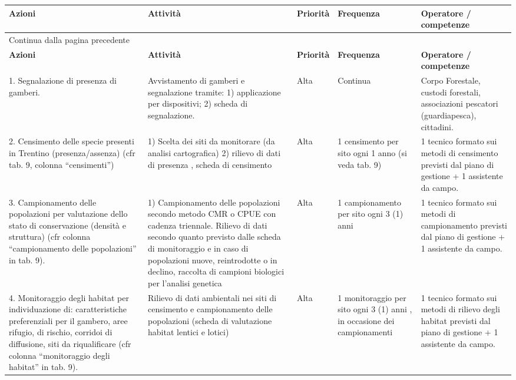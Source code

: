 \documentclass[11pt,a4paper,italian,twoside,openany]{memoir}
\begin{document}
\begin{longtable}[c]{@{}p{}p{}p{}p{}p{}@{}}
\toprule
{\cellcolor{white}}\textbf{Azioni} & \textbf{Attività} & \textbf{Priorità} & \textbf{Frequenza} & \textbf{Operatore / competenze} \\* \midrule
\endfirsthead
\multicolumn{5}{l}{\footnotesize Continua dalla pagina precedente}\\
\toprule
\textbf{Azioni} & \textbf{Attività} & \textbf{Priorità} & \textbf{Frequenza} & \textbf{Operatore / competenze} \\* \midrule
\endhead
1. Segnalazione di presenza di gamberi. & Avvistamento di gamberi e segnalazione tramite: 1) applicazione per dispositivi; 2) scheda di segnalazione. & Alta & Continua & Corpo Forestale, custodi forestali, associazioni pescatori (guardiapesca), cittadini. \\
\rowcolor[HTML]{EFEFEF}2. Censimento delle specie presenti in Trentino (presenza/assenza) (cfr tab. 9, colonna “censimenti”) & 1) Scelta dei siti da monitorare (da analisi cartografica) 2) rilievo di dati di presenza , scheda di censimento & Alta & 1 censimento per sito ogni 1 anno (si veda tab. 9) & 1 tecnico formato sui metodi di censimento previsti dal piano di gestione  + 1 assistente da campo. \\
3. Campionamento delle popolazioni per valutazione dello stato di conservazione (densità e struttura) (cfr colonna “campionamento delle popolazioni” in tab. 9). & 1) Campionamento delle popolazioni secondo metodo CMR o CPUE con cadenza triennale. Rilievo di dati secondo quanto previsto dalle scheda di monitoraggio e in caso di popolazioni nuove, reintrodotte o in declino, raccolta di campioni biologici per l'analisi genetica & Alta & 1 campionamento per sito ogni 3 (1) anni & 1 tecnico formato sui metodi di campionamento previsti dal piano di gestione  + 1 assistente da campo. \\
\rowcolor[HTML]{EFEFEF}4. Monitoraggio degli habitat per individuazione di: caratteristiche preferenziali per il gambero, aree rifugio, di rischio, corridoi di diffusione, siti da riqualificare (cfr colonna “monitoraggio degli habitat” in tab. 9). & Rilievo di dati ambientali nei siti di censimento e campionamento delle popolazioni (scheda di valutazione habitat lentici e lotici) & Alta & 1 monitoraggio per sito ogni 3 (1) anni , in occasione dei campionamenti & 1 tecnico formato sui metodi di rilievo degli habitat previsti dal piano di gestione  + 1 assistente da campo. \\

\end{longtable}
\end{document}
